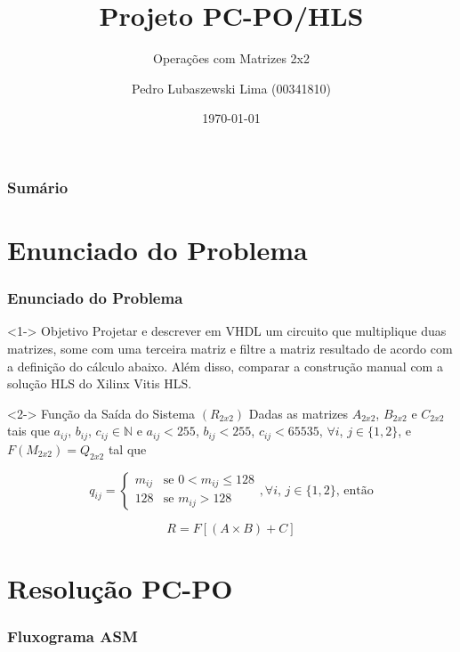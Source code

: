 \documentclass{beamer}
\title[Projeto PC-PO/HLS]{Projeto PC-PO/HLS}
\subtitle{Operações com Matrizes 2x2}
\author[Pedro Lubaszewski Lima]{Pedro Lubaszewski Lima (00341810)}
\institute[]{INF01175\\Sistemas Digitais para Computadores A}
\date[\today]{\today}
\begin{document}
    \begin{frame}
        \maketitle
    \end{frame}

    \begin{frame}
        \frametitle{Sumário}
        \tableofcontents
    \end{frame}

    \section{Enunciado do Problema}
    \begin{frame}
        \frametitle{Enunciado do Problema}

        \begin{block}<1->
            {Objetivo}
            Projetar e descrever em VHDL um
            circuito que multiplique duas matrizes,
            some com uma terceira matriz e filtre a
            matriz resultado de acordo com a definição
            do cálculo abaixo. Além disso, comparar
            a construção manual com a solução HLS do
            Xilinx Vitis HLS.
        \end{block}

        \begin{block}<2->
            {Função da Saída do Sistema $ (R_{2x2}) $}
            Dadas as matrizes $ A_{2x2} $, $ B_{2x2} $
            e $ C_{2x2} $ tais que $ a_{ij} $, $ b_{ij} $,
            $ c_{ij} \in \mathbb{N} $ e $ a_{ij} < 255 $,
            $ b_{ij} < 255 $, $ c_{ij} < 65535 $, $ \forall i $,
            $ j \in \{ 1,2 \}$, e $ F(M_{2x2}) = Q_{2x2} $ tal que

            $$ q_{ij} = 
                \begin{cases}
                    m_{ij} & \text{se } 0 < m_{ij} \leqslant 128 \\
                    128 & \text{se } m_{ij} > 128
                \end{cases}
                \text{,} \,\forall i \text{, } j \in \{ 1,2 \} \text{, então}
            $$

            $$ R = F[(A \times B) + C] $$
        \end{block}
    \end{frame}

    \section{Resolução PC-PO}
    \begin{frame}
        \frametitle{Fluxograma ASM}
    \end{frame}
\end{document}
